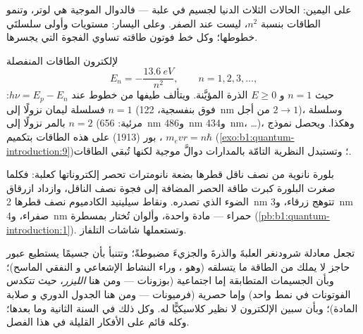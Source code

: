 \begin{omfigure}
{\small على اليمين: الحالات الثلاث الدنيا لجسيم في علبة --- فالدوال
الموجية هي  لوتر، وتنمو الطاقات بنسبة
$n^2$،  ليست عند الصفر. وعلى اليسار: مستويات
 وأولى سلسلتَي خطوطها؛ وكل خط فوتون
طاقته تساوي الفجوة التي يجسرها.}
\end{omfigure}

\begin{proposition}\label{prop:b1:quantum-introduction:hydrogen}
لإلكترون  الطاقات المنفصلة
\[
E_n = -\frac{\qty{13.6}{eV}}{n^2} , \qquad n = 1, 2, 3, \ldots ,
\]
حيث $n = 1$  و $E \geq 0$ الذرة المؤيَّنة. ويتألف
طيفها من خطوط عند $h\nu = E_p - E_n$: فسلسلة ليمان نزولًا
إلى $n = 1$ (فوق بنفسجية، \qty{122}{nm} من أجل $2 \to 1$)، وسلسلة بالمر
نزولًا إلى $n = 2$ (مرئية: \qty{656}{nm} و\qty{486}{nm} و\qty{434}{nm}، \ldots)،
وهكذا. ويحصل نموذج بور (1913) على هذه الطاقات بتكميم
 ، $m_evr = n\hbar$
(\cref{exo:b1:quantum-introduction:9})؛ وتستبدل النظرية التامّة بالمدارات
دوالَّ موجية لكنها تُبقي الطاقات.
\end{proposition}
\admitted

\begin{example}\label{ex:b1:quantum-introduction:dot}
بلورة نانوية من نصف ناقل قطرها بضعة نانومترات تحصر
إلكتروناتها كعلبة: فكلما صغرت البلورة كبرت
طاقة الحصر المضافة إلى فجوة نصف الناقل، وازداد ازرقاق
الضوء الذي تصدره. ونقاط سيلينيد الكادميوم نصف قطرها \qty{2}{nm} تتوهج زرقاء،
و\qty{3}{nm} صفراء، و\qty{4}{nm} حمراء --- مادة واحدة، وألوان تُختار
بمسطرة (\cref{pb:b1:quantum-introduction:1}). وتستعملها شاشات التلفاز.
\end{example}

\begin{remark}\label{rem:b1:quantum-introduction:rest}
تجعل معادلة شرودنغر العلبةَ والذرةَ والجزيءَ
مضبوطةً؛ وتتنبأ بأن جسيمًا يستطيع عبور حاجز لا يملك من
الطاقة ما يتسلقه (وهو \emph{}، وراء النشاط الإشعاعي و
 النفقي الماسح)؛ وبأن الجسيمات المتطابقة إما اجتماعية
(بوزونات --- ومن هنا \emph{الليزر}، حيث تتكدس الفوتونات في نمط
واحد) وإما حصرية (فرميونات --- ومن هنا الجدول الدوري و
صلابة المادة)؛ وبأن سبين الإلكترون 
لا نظير كلاسيكيًّا له. وكل ذلك في السنة الثانية وما بعدها؛
وكله قائم على الأفكار القليلة في هذا الفصل.
\end{remark}

